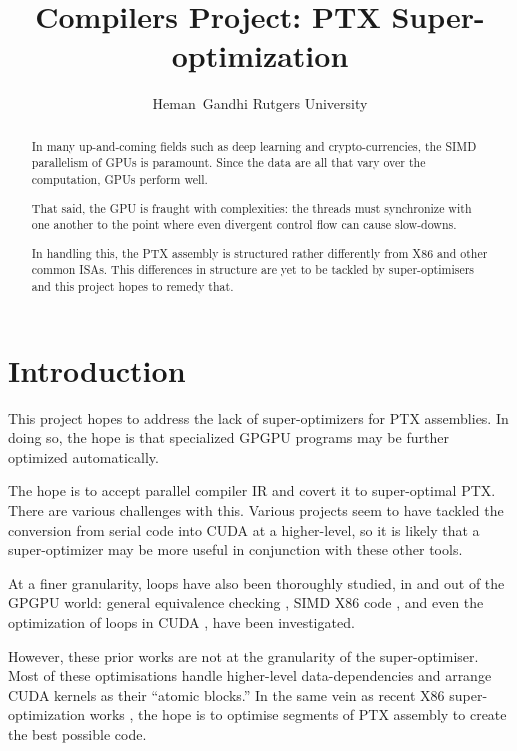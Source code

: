 \documentclass[letterpaper,twocolumn,10pt]{article}
\title{\Large \bf Compilers Project: PTX Super-optimization}
\date{}
\author{\rm{Heman\ Gandhi} Rutgers University}
\begin{document}


\maketitle

\begin{abstract}
In many up-and-coming fields such as deep learning and
crypto-currencies, the SIMD parallelism of GPUs is paramount.
Since the data are all that vary over the computation, GPUs
perform well.

That said, the GPU is fraught with complexities:
the threads must synchronize with one another to the
point where even divergent control flow can cause
slow-downs.

In handling this, the PTX assembly is structured rather
differently from X86 and other common ISAs. This differences
in structure are yet to be tackled by super-optimisers and
this project hopes to remedy that.
\end{abstract}

\section{Introduction}

This project hopes to address the lack of super-optimizers for
PTX assemblies. In doing so, the hope is that specialized GPGPU
programs may be further optimized automatically.

The hope is to accept parallel compiler IR and
covert it to super-optimal PTX. There are various challenges with
this. Various projects
seem to have tackled the conversion from serial code into CUDA at
a higher-level, so it is likely that a super-optimizer may be more
useful in conjunction with these other tools. \cite{hicuda} \cite{CUDASynth}

At a finer granularity, loops have also been thoroughly studied,
in and out of the GPGPU world: general equivalence checking \cite{DataEquiv},
SIMD X86 code \cite{SIMDSynth}, and even the optimization of loops in CUDA
\cite{CUDALoops}, have been investigated.

However, these prior works are not at the granularity of the super-optimiser.
Most of these optimisations handle higher-level data-dependencies and arrange
CUDA kernels as their ``atomic blocks.'' In the same vein as recent X86
super-optimization works \cite{superopt}, the hope is to optimise segments
of PTX assembly to create the best possible code.
\end{document}
